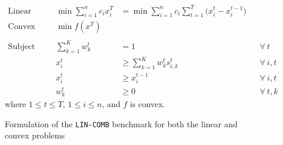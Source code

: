 \begin{figure}[ht]
	\begin{mdframed}
		\begin{align*}
			\text{Linear objective:} && \min \sum_{i=1}^{n} c_{i} x_{i}^{T} &= \min \sum_{i=1}^{n} c_{i} \sum_{t=1}^{T}\bigl( x_{i}^{t} - x_{i}^{t-1}\bigr)\\
			\text{Convex objective:} && \min f(x^{T}) &\\
		&& & \\
		\text{Subject to (in both cases):} &&
			\sum_{k=1}^{K} w_{k}^{t} &= 1  && \forall\ t \\
			&& x_{i}^{t} &\geq \sum_{k=1}^{K} w_{k}^{t} s_{i,k}^{t} && \forall\ i, t\\
			&& x_{i}^{t} &\geq x_{i}^{t-1} && \forall\ i, t\\
			&& w_{k}^{t} &\geq 0  && \forall\ t, k
		\end{align*}
		where $1 \leq t \leq T$, $1 \leq i \leq n$, and $f$ is convex.
		\vspace{5pt}
	\end{mdframed}
	\caption{Formulation of the \texttt{LIN-COMB} benchmark for both the linear and convex problems}
	\label{fig:benchmark}
	\end{figure}

